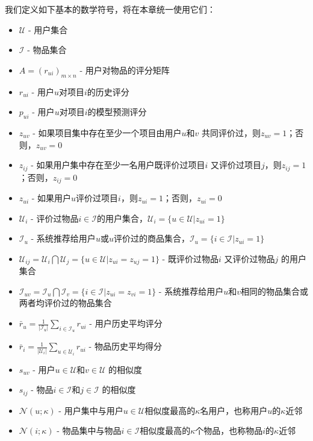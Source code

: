 我们定义如下基本的数学符号，将在本章统一使用它们：
\begin{itemize}
  \item $\mathcal U$ - 用户集合
  \item $\mathcal I$ - 物品集合
  \item $A = (r_{ui})_{m\times n}$ - 用户对物品的评分矩阵
  \item $r_{ui}$ - 用户$u$对项目$i$的历史评分
  \item $p_{ui}$ - 用户$u$对项目$i$的模型预测评分
  \item $z_{uv}$ - 如果项目集中存在至少一个项目由用户$u$和$v$ 共同评价过，则$z_{uv}=1$；否则，$z_{uv}=0$
  \item $z_{ij}$ - 如果用户集中存在至少一名用户既评价过项目$i$ 又评价过项目$j$，则$z_{ij}=1$；否则，$z_{ij}=0$
  \item $z_{ui}$ - 如果用户$u$评价过项目$i$，则$z_{ui}=1$；否则，$z_{ui}=0$
  \item $\mathcal U_i$ - 评价过物品$i\in \mathcal I$的用户集合，$\mathcal U_i=\{u\in \mathcal U|z_{ui}=1\}$
  \item $\mathcal I_u$ - 系统推荐给用户$u$或$u$评价过的商品集合，$\mathcal I_u=\{i\in \mathcal I|z_{ui}=1\}$
  \item $\mathcal U_{ij}=\mathcal U_i \bigcap \mathcal U_j=\{u\in\mathcal U|z_{ui}=z_{uj}=1\}$ - 既评价过物品$i$ 又评价过物品$j$ 的用户集合
  \item $\mathcal I_{uv}=\mathcal I_u \bigcap \mathcal I_v=\{i\in\mathcal I|z_{ui}=z_{vi}=1\}$ - 系统推荐给用户$u$和$v$相同的物品集合或两者均评价过的物品集合
  \item $\bar r_u = \frac{1}{|\mathcal I_u|} \sum\limits_{i\in\mathcal I_u} r_{ui}$ - 用户历史平均评分
  \item $\bar r_i = \frac{1}{|\mathcal U_i|} \sum\limits_{u\in\mathcal U_i} r_{ui}$ - 物品历史平均得分
  \item $s_{uv}$ - 用户$u\in \mathcal U$和$v\in \mathcal U$ 的相似度
  \item $s_{ij}$ - 物品$i\in \mathcal I$和$j\in \mathcal I$ 的相似度
  \item $\mathcal N(u;\kappa)$ - 用户集中与用户$u\in \mathcal U$相似度最高的$\kappa$名用户，也称用户$u$的$\kappa$近邻
  \item $\mathcal N(i;\kappa)$ - 物品集中与物品$i\in \mathcal I$相似度最高的$\kappa$个物品，也称物品$i$的$\kappa$近邻
\end{itemize}

